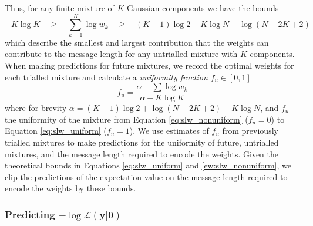 \documentclass{elsarticle}
\newcommand{\vect}[1]{\boldsymbol{\mathbf{#1}}}
\def\vectheta{\vect{\theta}}
\def\weight{w}
\def\datum{y}
\def\data{\vect{\datum}}
\begin{document}
\noindent{}Thus, for any finite mixture of $K$ Gaussian components we have the bounds
\begin{equation}
-K\log{K} \quad \geq \quad \sum_{k=1}^{K}\log\weight_k \quad \geq \quad (K - 1)\log{2} - K\log{N} + \log{(N - 2K + 2)}
\end{equation}
\noindent{}which  describe the smallest and largest contribution that the weights can contribute to the message length for any untrialled mixture with $K$ components. When making predictions for future mixtures, we record the optimal weights for each trialled mixture and calculate a \emph{uniformity fraction} $f_u \in [0, 1]$
\begin{equation}
f_u = \frac{\alpha - \sum\log\weight_k}{\alpha + K\log{K}}
\end{equation}
\noindent{}where for brevity $\alpha = (K-1)\log{2} + \log(N-2K+2)-K\log{N}$,
and $f_u$ the uniformity of the mixture from Equation \ref{eq:slw_nonuniform} ($f_u = 0$) to Equation \ref{eq:slw_uniform} ($f_u = 1$). We use estimates of $f_u$ from previously trialled mixtures to make predictions for the uniformity of future,
untrialled mixtures, and the message length required to encode the weights.
Given the theoretical bounds in Equations \ref{eq:slw_uniform} and \ref{ew:slw_nonuniform},
we clip the predictions of the expectation value on the message length required to encode the weights by these bounds.


\subsubsection{Predicting $-\log{\mathcal{L}(\data|\vectheta)}$}
\end{document}
